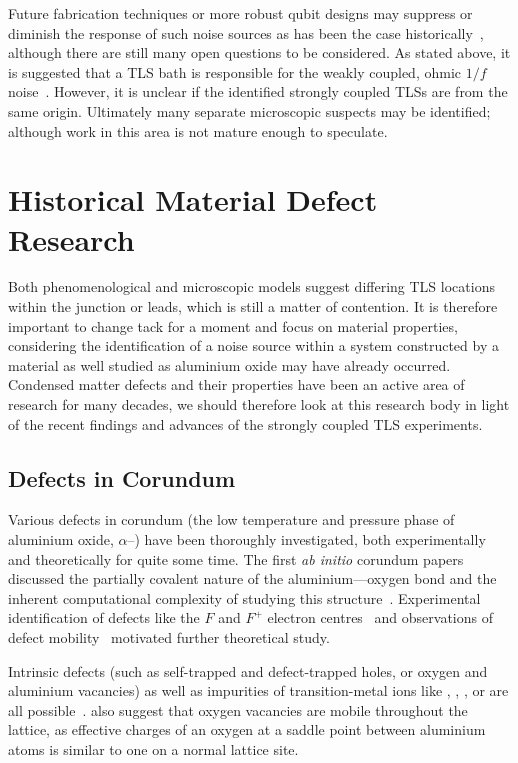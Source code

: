Future fabrication techniques or more robust qubit designs may suppress or diminish the response of such noise sources as has been the case historically~\cite{Vion2002, Martinis2005, Koch2007, Schreier2008, Houck2008}, although there are still many open questions to be considered.
As stated above, it is suggested that a TLS bath is responsible for the weakly coupled, ohmic $1/f$ noise~\cite{Dutta1981}.
However, it is unclear if the identified strongly coupled TLSs are from the same origin.
Ultimately many separate microscopic suspects may be identified; although work in this area is not mature enough to speculate.

\section{Historical Material Defect Research}

Both phenomenological and microscopic models suggest differing TLS locations within the junction or leads, which is still a matter of contention.
It is therefore important to change tack for a moment and focus on material properties, considering the identification of a noise source within a system constructed by a material as well studied as aluminium oxide may have already occurred.
Condensed matter defects and their properties have been an active area of research for many decades, we should therefore look at this research body in light of the recent findings and advances of the strongly coupled TLS experiments.

\subsection{Defects in Corundum}\label{sec:cordef}
Various defects in corundum (the low temperature and pressure phase of aluminium oxide, $\alpha$--) have been thoroughly investigated, both experimentally and theoretically for quite some time.
The first \emph{ab initio} corundum papers discussed the partially covalent nature of the aluminium---oxygen bond and the inherent computational complexity of studying this structure~\cite{Causa1987}.
Experimental identification of defects like the $F$
and $F^+$ electron centres~\cite{Kotomin1989} and observations of defect mobility~\cite{Kulis1991} motivated further theoretical study.

Intrinsic defects (such as self-trapped and defect-trapped holes, or oxygen and aluminium vacancies) as well as impurities of transition-metal ions like , , ,  or  are all possible~\cite{Jacobs1994}.
\citeauthor{Jacobs1994} also suggest that oxygen vacancies are mobile throughout the lattice, as effective charges of an oxygen at a saddle point between aluminium atoms is similar to one on a normal lattice site.

